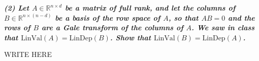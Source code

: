 \textbf{\textit{(2) Let $A \in \mathbb{R}^{n\times d}$ be a matrix of full rank, and let the columns of $B \in \mathbb{R}^{n \times (n -d)}$ be a basis of the row space of $A$, so that $AB = 0$ and the rows of $B$ are a Gale transform of the columns of $A$. We saw in class that $\text{LinVal}(A) = \text{LinDep}(B)$. Show that $\text{LinVal}(B) = \text{LinDep}(A)$.}}

\vspace{3pt}

WRITE HERE
